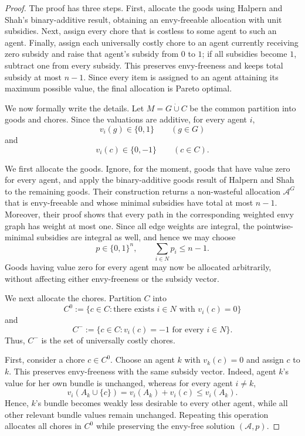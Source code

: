 \documentclass[sigconf,anonymous,nonacm]{aamas}
\newcommand{\alloc}{\mathcal{A}}
\begin{document}
\begin{proof}
The proof has three steps. First, allocate the goods using Halpern and Shah's binary-additive result, obtaining an envy-freeable allocation with unit subsidies. Next, assign every chore that is costless to some agent to such an agent. Finally, assign each universally costly chore to an agent currently receiving zero subsidy and raise that agent's subsidy from $0$ to $1$; if all subsidies become $1$, subtract one from every subsidy. This preserves envy-freeness and keeps total subsidy at most $n-1$. Since every item is assigned to an agent attaining its maximum possible value, the final allocation is Pareto optimal.


We now formally write the details. Let $M=G\mathbin{\dot\cup}C$ be the common partition into goods and chores. Since the valuations are additive, for every agent $i$,
\[
v_i(g)\in\{0,1\}\qquad (g\in G)
\]
and
\[
v_i(c)\in\{0,-1\}\qquad (c\in C).
\]

We first allocate the goods. Ignore, for the moment, goods that have value zero for every agent, and apply the binary-additive goods result of Halpern and Shah~\cite{HS19} to the remaining goods. Their construction returns a non-wasteful allocation $\alloc^G$ that is envy-freeable and whose minimal subsidies have total at most $n-1$. Moreover, their proof shows that every path in the corresponding weighted envy graph has weight at most one. Since all edge weights are integral, the pointwise-minimal subsidies are integral as well, and hence we may choose
\[
p\in\{0,1\}^n,
\qquad
\sum_{i\in N}p_i\leq n-1.
\]
Goods having value zero for every agent may now be allocated arbitrarily, without affecting either envy-freeness or the subsidy vector.

We next allocate the chores. Partition $C$ into
\[
C^0:=\{c\in C:\text{there exists }i\in N\text{ with }v_i(c)=0\}
\]
and
\[
C^-:=\{c\in C:v_i(c)=-1\text{ for every }i\in N\}.
\]
Thus, $C^-$ is the set of universally costly chores.

First, consider a chore $c\in C^0$. Choose an agent $k$ with $v_k(c)=0$ and assign $c$ to $k$. This preserves envy-freeness with the same subsidy vector. Indeed, agent $k$'s value for her own bundle is unchanged, whereas for every agent $i\neq k$,
\[
v_i(A_k\cup\{c\})
=
v_i(A_k)+v_i(c)
\leq v_i(A_k).
\]
Hence, $k$'s bundle becomes weakly less desirable to every other agent, while all other relevant bundle values remain unchanged. Repeating this operation allocates all chores in $C^0$ while preserving the envy-free solution $(\alloc,p)$.


\end{proof}
\end{document}
